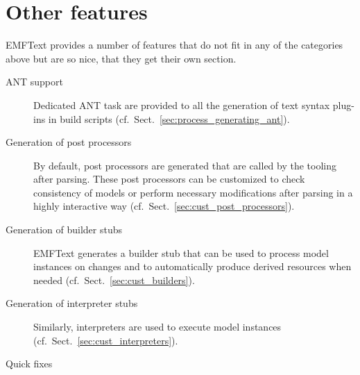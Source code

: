 \section{Other features}

EMFText provides a number of features that do not fit in any of the categories 
above but are so nice, that they get their own section.

\begin{description}

  \item[ANT support]
        Dedicated ANT task are provided to all the generation of text syntax 
        plug-ins in build scripts (cf.~Sect.~\ref{sec:process_generating_ant}).
        
  \item[Generation of post processors]
        By default, post processors are generated that are called by the 
        tooling after parsing. These post processors can be customized to
        check consistency of models or perform necessary modifications after
        parsing in a highly interactive way (cf.~Sect.~\ref{sec:cust_post_processors}).

  \item[Generation of builder stubs]
        EMFText generates a builder stub that can be used to process 
        model instances on changes and to automatically produce derived 
        resources when needed (cf.~Sect.~\ref{sec:cust_builders}).
        
  \item[Generation of interpreter stubs]
        Similarly, interpreters are used to execute model instances 
        (cf.~Sect.~\ref{sec:cust_interpreters}).
  
  \item[Quick fixes]
      
\end{description}